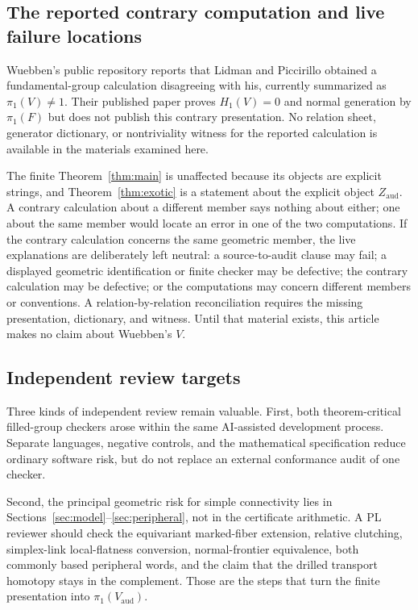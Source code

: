 \documentclass[11pt]{article}
\newcommand{\pione}{\pi_1}
\theoremstyle{definition}
\begin{document}
\subsection{The reported contrary computation and live failure locations}
\label{sec:contrary}

Wuebben's public repository reports that Lidman and Piccirillo obtained a
fundamental-group calculation disagreeing with his, currently summarized as
$\pione(V)\ne1$.  Their published paper \cite{LidmanPiccirillo} proves
$H_1(V)=0$ and normal generation by $\pione(F)$ but does not publish this
contrary presentation.  No relation sheet, generator dictionary, or
nontriviality witness for the reported calculation is available in the
materials examined here.

The finite Theorem~\ref{thm:main} is unaffected because its objects are
explicit strings, and Theorem~\ref{thm:exotic} is a statement about the
explicit object $Z_{\mathrm{aud}}$.  A contrary calculation about a
different member says nothing about either; one about the same member would
locate an error in one of the two computations.  If the contrary calculation
concerns the same geometric member, the live explanations are deliberately left neutral: a
source-to-audit clause may fail; a displayed geometric identification or
finite checker may be defective; the contrary calculation may be defective;
or the computations may concern different members or conventions.  A
relation-by-relation reconciliation requires the missing presentation,
dictionary, and witness.  Until that material exists, this article makes no
claim about Wuebben's $V$.

\subsection{Independent review targets}

Three kinds of independent review remain valuable.  First, both
theorem-critical filled-group checkers arose within the same AI-assisted
development process.  Separate languages, negative controls, and the
mathematical specification reduce ordinary software risk, but do not replace
an external conformance audit of one checker.

Second, the principal geometric risk for simple connectivity lies in
Sections~\ref{sec:model}--\ref{sec:peripheral}, not in the certificate
arithmetic.  A PL reviewer should check the equivariant marked-fiber
extension, relative clutching, simplex-link local-flatness conversion,
normal-frontier equivalence, both commonly based peripheral words, and the
claim that the drilled transport homotopy stays in the complement.  Those
are the steps that turn the finite presentation into
$\pione(V_{\mathrm{aud}})$.
\end{document}
